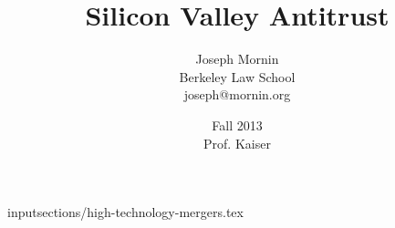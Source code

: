 \documentclass[letterpaper,titlepage]{article}
\begin{document}
\title{Silicon Valley Antitrust}
\author{Joseph Mornin\\Berkeley Law School\\joseph@mornin.org}
\date{Fall 2013\\Prof. Kaiser}
\maketitle
\tableofcontents
\pagebreak



\newpage

\newpage

\newpage

\newpage

\newpage
\newpage

\newpage
\newpage
\newpage
\newpage
input{sections/high-technology-mergers.tex}
 
\end{document}
